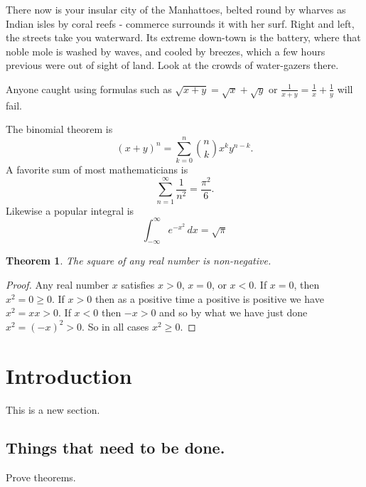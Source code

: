 \documentclass{amsart}
\newtheorem{thm}{Theorem}[section]
\theoremstyle{definition}
\theoremstyle{remark}
\numberwithin{equation}{section}
\begin{document}
There now is your insular city of the Manhattoes, belted round by
wharves as Indian isles by coral reefs - commerce surrounds it with
her surf. Right and left, the streets take you waterward. Its extreme
down-town is the battery, where that noble mole is washed by waves,
and cooled by breezes, which a few hours previous were out of sight of
land. Look at the crowds of water-gazers there.



Anyone caught using formulas such as $\sqrt{x+y}=\sqrt{x}+\sqrt{y}$ 
or $\frac{1}{x+y}=\frac{1}{x}+\frac{1}{y}$ will fail.


The binomial theorem is
$$
(x+y)^n=\sum_{k=0}^n\binom{n}{k}x^ky^{n-k}.
$$
A favorite sum of most mathematicians is
$$
\sum_{n=1}^\infty \frac{1}{n^2}=\frac{\pi^2}{6}.
$$
Likewise a popular integral is
$$
\int_{-\infty}^\infty e^{-x^2}\,dx=\sqrt{\pi}
$$



\begin{thm} The square of any real number is non-negative.
\end{thm}


\begin{proof}
Any real number $x$ satisfies $x>0$, $x=0$, or $x<0$.
If $x=0$, then $x^2=0\ge 0$.  If $x>0$ then as a positive time a
positive is positive we have $x^2=xx>0$.  If $x<0$ then $-x>0$ and so
by what we have just done $x^2=(-x)^2>0$.  So in all cases $x^2\ge0$.
\end{proof}




\section{Introduction}

This is a new section.


\subsection{Things that need to be done.}
Prove theorems.
\end{document}
